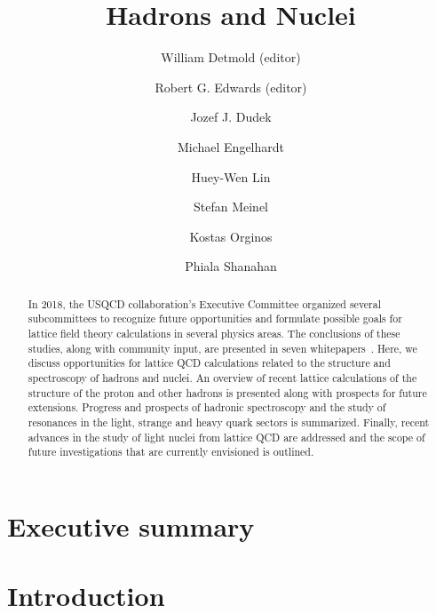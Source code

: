 \documentclass[hyperpdf,aps,prd,superscriptaddress,nofootinbib,preprint,preprintnumbers,floatfix,tightenlines]{revtex4-1}
\begin{document}
\title{Hadrons and Nuclei}
%
\author{William Detmold (editor)}
%
\author{Robert G. Edwards (editor)}
%
\author{Jozef J. Dudek}
%
\author{Michael Engelhardt}
%
\author{Huey-Wen Lin}
%
\author{Stefan Meinel}
%
\author{Kostas Orginos}
%
\author{Phiala Shanahan}

\begin{abstract}
  
In 2018, the USQCD collaboration’s Executive Committee organized several subcommittees to recognize future opportunities and formulate possible goals for lattice field theory calculations in several physics areas.  The conclusions of these studies, along with community input, are presented in seven whitepapers~\cite{Bazavov:2018qcd,Brower:2018qcd,Davoudi:2018qcd,Detmold:2018qcd,Joo:2018qcd,Kronfeld:2018qcd,Lehner:2018qcd}.
  Here, we discuss opportunities for lattice QCD calculations related to the structure and spectroscopy of hadrons and nuclei. An overview of recent lattice calculations of the structure of the proton and other hadrons is presented along with prospects for future extensions. Progress and prospects of hadronic spectroscopy and the study of resonances in the light, strange and heavy quark sectors is summarized. Finally, recent advances in the study of light nuclei from lattice QCD are addressed and the scope of future investigations that are currently envisioned is outlined.
  
\end{abstract}


\maketitle

\tableofcontents
\newpage 

\section*{Executive summary}


\section{Introduction}
\label{sec:intro}

\end{document}

